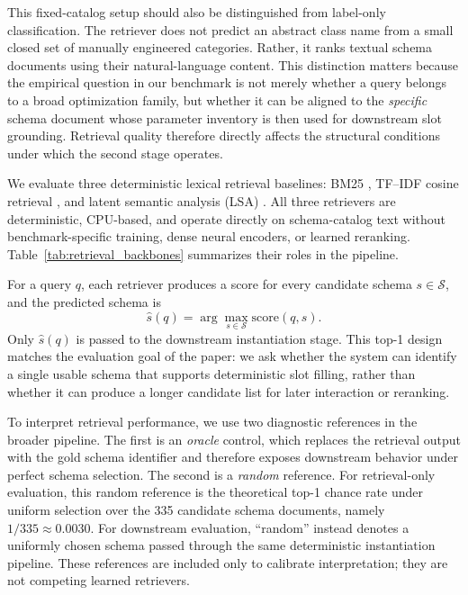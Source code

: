 \documentclass[pdflatex,sn-basic,Numbered]{sn-jnl}
\begin{document}
This fixed-catalog setup should also be distinguished from label-only classification. The retriever does not predict an abstract class name from a small closed set of manually engineered categories. Rather, it ranks textual schema documents using their natural-language content. This distinction matters because the empirical question in our benchmark is not merely whether a query belongs to a broad optimization family, but whether it can be aligned to the \emph{specific} schema document whose parameter inventory is then used for downstream slot grounding. Retrieval quality therefore directly affects the structural conditions under which the second stage operates.

We evaluate three deterministic lexical retrieval baselines: BM25 \cite{robertson2009bm25}, TF--IDF cosine retrieval \cite{pedregosa2011sklearn}, and latent semantic analysis (LSA) \cite{deerwester1990lsa}. All three retrievers are deterministic, CPU-based, and operate directly on schema-catalog text without benchmark-specific training, dense neural encoders, or learned reranking. Table~\ref{tab:retrieval_backbones} summarizes their roles in the pipeline.

For a query $q$, each retriever produces a score for every candidate schema $s \in \mathcal{S}$, and the predicted schema is
\begin{equation}
\hat{s}(q) = \arg\max_{s \in \mathcal{S}} \mathrm{score}(q,s).
\label{eq:schema_retrieval}
\end{equation}
Only $\hat{s}(q)$ is passed to the downstream instantiation stage. This top-1 design matches the evaluation goal of the paper: we ask whether the system can identify a single usable schema that supports deterministic slot filling, rather than whether it can produce a longer candidate list for later interaction or reranking.

To interpret retrieval performance, we use two diagnostic references in the broader pipeline. The first is an \emph{oracle} control, which replaces the retrieval output with the gold schema identifier and therefore exposes downstream behavior under perfect schema selection. The second is a \emph{random} reference. For retrieval-only evaluation, this random reference is the theoretical top-1 chance rate under uniform selection over the 335 candidate schema documents, namely $1/335 \approx 0.0030$. For downstream evaluation, ``random'' instead denotes a uniformly chosen schema passed through the same deterministic instantiation pipeline. These references are included only to calibrate interpretation; they are not competing learned retrievers.
\end{document}
